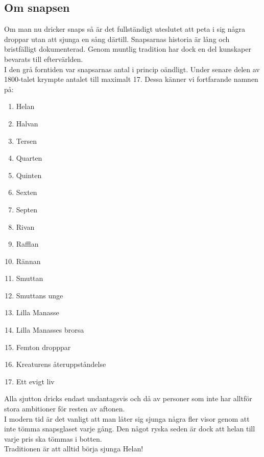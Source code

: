 \pagestyle{Snapsvisor}
\subsection{\textbf{Om snapsen}}
Om man nu dricker snaps så är det fullständigt uteslutet att peta i
sig några droppar utan att sjunga en sång därtill.
Snapsarnas historia är lång och bristfälligt dokumenterad. Genom
muntlig tradition har dock en del kunskaper bevarats till
eftervärlden.\\%
I den grå forntiden var snapsarnas antal i princip oändligt. Under
senare delen av 1800-talet krympte antalet till maximalt 17. Dessa
känner vi fortfarande namnen på:
\begin{multicols}{2}[]
    \begin{enumerate}
        \item Helan
        \item Halvan
        \item Tersen
        \item Quarten
        \item Quinten
        \item Sexten
        \item Septen
        \item Rivan
        \item Rafflan
        \item Rännan
        \item Smuttan
        \item Smuttans unge
        \item Lilla Manasse
        \item Lilla Manasses brorsa
        \item Femton dropppar
        \item Kreaturens återuppståndelse
        \item Ett evigt liv
    \end{enumerate}
\end{multicols}
Alla sjutton dricks endast undantagsvis och då av personer som
inte har alltför stora ambitioner för resten av aftonen.\\%
I modern tid är det vanligt att man låter sig sjunga några fler visor
genom att inte tömma snapsglaset varje gång. Den något ryska
seden är dock att helan till varje pris ska tömmas i botten.\\%
Traditionen är att alltid börja sjunga Helan!
